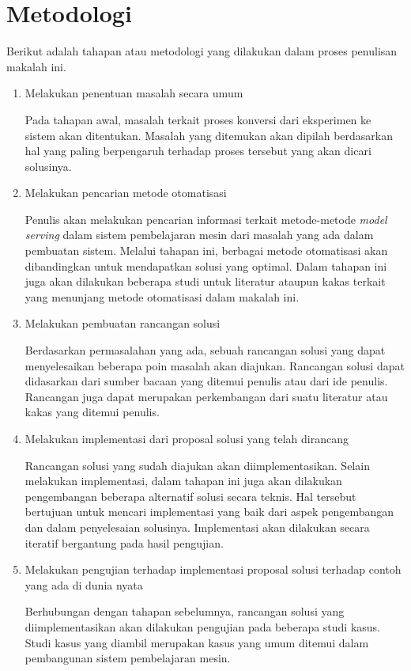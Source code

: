 \section{Metodologi}

Berikut adalah tahapan atau metodologi yang dilakukan dalam proses penulisan makalah ini.

\begin{enumerate}
  \item Melakukan penentuan masalah secara umum
  
  Pada tahapan awal, masalah terkait proses konversi dari eksperimen ke sistem akan ditentukan.
  Masalah yang ditemukan akan dipilah berdasarkan hal yang paling berpengaruh terhadap proses tersebut yang akan dicari solusinya.

  \item Melakukan pencarian metode otomatisasi 
  
  Penulis akan melakukan pencarian informasi terkait metode-metode \textit{model serving} dalam sistem pembelajaran mesin dari masalah yang ada dalam pembuatan sistem.
  Melalui tahapan ini, berbagai metode otomatisasi akan dibandingkan untuk mendapatkan solusi yang optimal.
  Dalam tahapan ini juga akan dilakukan beberapa studi untuk literatur ataupun kakas terkait yang menunjang metode otomatisasi dalam makalah ini.

  \item Melakukan pembuatan rancangan solusi
  
  Berdasarkan permasalahan yang ada, sebuah rancangan solusi yang dapat menyelesaikan beberapa poin masalah akan diajukan.
  Rancangan solusi dapat didasarkan dari sumber bacaan yang ditemui penulis atau dari ide penulis.
  Rancangan juga dapat merupakan perkembangan dari suatu literatur atau kakas yang ditemui penulis.

  \item Melakukan implementasi dari proposal solusi yang telah dirancang
  
  Rancangan solusi yang sudah diajukan akan diimplementasikan.
  Selain melakukan implementasi, dalam tahapan ini juga akan dilakukan pengembangan beberapa alternatif solusi secara teknis.
  Hal tersebut bertujuan untuk mencari implementasi yang baik dari aspek pengembangan dan dalam penyelesaian solusinya.
  Implementasi akan dilakukan secara iteratif bergantung pada hasil pengujian.

  \item Melakukan pengujian terhadap implementasi proposal solusi terhadap contoh yang ada di dunia nyata
  
  Berhubungan dengan tahapan sebelumnya, rancangan solusi yang diimplementasikan akan dilakukan pengujian pada beberapa studi kasus.
  Studi kasus yang diambil merupakan kasus yang umum ditemui dalam pembangunan sistem pembelajaran mesin.
  
\end{enumerate}